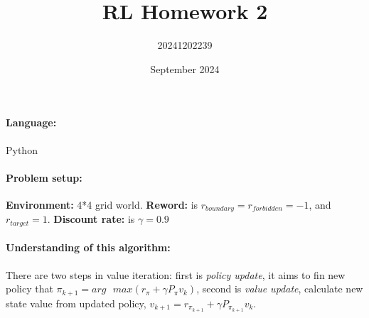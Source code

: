 \documentclass[UTF8]{ctexart}
\title{RL Homework 2}
\author{20241202239}
\date{September 2024}
\begin{document}
	
	\maketitle
	\paragraph{Language:} Python
	
	\paragraph{Problem setup:}
	\textbf{Environment:} 4*4 grid world.
	\textbf{Reword:} is $r_{boundary} = r_{forbidden}=-1$, and $r_{target}=1$. 
	\textbf{Discount rate:} is $\gamma =0.9$

	\paragraph{Understanding of this algorithm:} There are two steps in value  iteration: first is \textit{policy update}, it aims to fin new policy that $\pi_{k+1} = arg \textbf{ }max(r_{\pi} + \gamma P_{\pi}v_k)$, second is \textit{value update}, calculate new state value from updated policy, $v_{k+1} = r_{\pi_{k+1}} + \gamma P_{\pi_{k+1}}v_k$.
\end{document}
